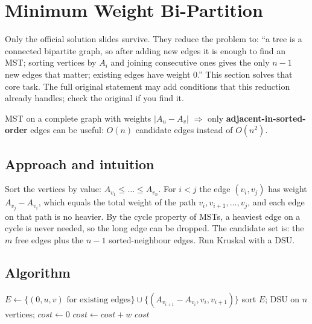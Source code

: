 \section{Minimum Weight Bi-Partition}
\label{sec:g-min-bipartition}

\begin{reconbox}
Only the official solution slides survive. They reduce the problem to: ``a
tree is a connected bipartite graph, so after adding new edges it is enough to
find an MST; sorting vertices by $A_i$ and joining consecutive ones gives the
only $n-1$ new edges that matter; existing edges have weight $0$.'' This
section solves that core task. The full original statement may add conditions
that this reduction already handles; check the original if you find it.
\end{reconbox}


\begin{patternbox}
MST on a complete graph with weights $|A_u-A_v|$ $\Rightarrow$ only
\textbf{adjacent-in-sorted-order} edges can be useful: $O(n)$ candidate edges
instead of $O(n^2)$.
\end{patternbox}

\subsection*{Approach and intuition}

Sort the vertices by value: $A_{v_1}\le\dots\le A_{v_n}$. For $i<j$ the edge
$(v_i,v_j)$ has weight $A_{v_j}-A_{v_i}$, which equals the total weight of the
path $v_i,v_{i+1},\dots,v_j$, and each edge on that path is no heavier. By the
cycle property of MSTs, a heaviest edge on a cycle is never needed, so the
long edge can be dropped. The candidate set is: the $m$ free edges plus the
$n-1$ sorted-neighbour edges. Run Kruskal with a DSU.

\subsection*{Algorithm}
\begin{algorithmic}[1]
\State $E\gets\{(0,u,v)\text{ for existing edges}\}\cup\{(A_{v_{i+1}}-A_{v_i},v_i,v_{i+1})\}$
\State sort $E$; DSU on $n$ vertices; $cost\gets0$
  $cost\gets cost+w$ \EndIf \EndFor
\State \Return $cost$
\end{algorithmic}


